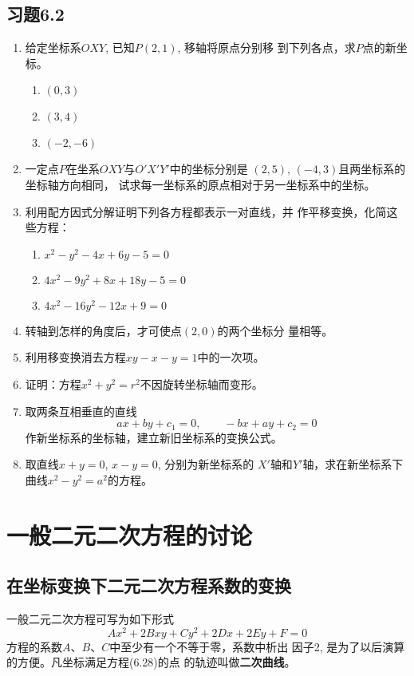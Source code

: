 \subsection*{习题6.2}
\begin{enumerate}
    \item 给定坐标系$OXY$, 已知$P(2,1)$, 移轴将原点分别移
    到下列各点，求$P$点的新坐标。
\begin{multicols}{3}
    \begin{enumerate}
        \item $(0,3)$
        \item $(3,4)$
        \item $(-2,-6)$
    \end{enumerate}
\end{multicols}

    \item 一定点$P$在坐系$OXY$与$O'X'Y'$中的坐标分别是
    $(2,5)$, $(-4,3)$且两坐标系的坐标轴方向相同，
    试求每一坐标系的原点相对于另一坐标系中的坐标。
    \item 利用配方因式分解证明下列各方程都表示一对直线，并
    作平移变换，化简这些方程：
\begin{enumerate}
\item $x^2-y^2-4x+6y-5=0$
\item $4x^2-9y^2+8x+18y-5=0$
\item $4x^2-16y^2-12x+9=0$
\end{enumerate}

    \item 转轴到怎样的角度后，才可使点$(2,0)$的两个坐标分
    量相等。
    \item 利用移变换消去方程$xy-x-y=1$中的一次项。
    \item 证明：方程$x^2+y^2=r^2$不因旋转坐标轴而变形。
    \item 取两条互相垂直的直线
  \[  ax+by+c_1=0,\qquad -bx+ay+c_2=0\]
    作新坐标系的坐标轴，建立新旧坐标系的变换公式。
    \item 取直线$x+y=0$, $x-y=0$, 分别为新坐标系的
    $X'$轴和$Y'$轴，求在新坐标系下曲线$x^2-y^2=a^2$的方程。
\end{enumerate}

\section{一般二元二次方程的讨论}
\subsection{在坐标变换下二元二次方程系数的变换}
一般二元二次方程可写为如下形式
\begin{equation}
    Ax^2+2Bxy+Cy^2+2Dx+2Ey+F=0
\end{equation}
方程的系数$A$、$B$、$C$中至少有一个不等于零，系数中析出
因子2, 是为了以后演算的方便。凡坐标满足方程(6.28)的点
的轨迹叫做\textbf{二次曲线}。

